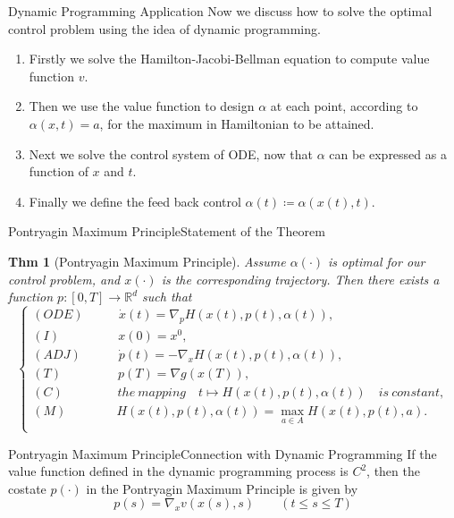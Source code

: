 \documentclass[english]{pkuslide}
\newtheorem{Thm}{Thm}
\begin{document}
\begin{frame}{Dynamic Programming} {Application}
Now we discuss how to solve the optimal control problem using the idea of dynamic programming.
\begin{enumerate}[<+->]
\item Firstly we solve the Hamilton-Jacobi-Bellman equation to compute value function $v$.
\item Then we use the value function to design $\alpha$ at each point, according to $\alpha(x,t)=a$, for the maximum in Hamiltonian to be attained.
\item Next we solve the control system of ODE, now that $\alpha$ can be expressed as a function of $x$ and $t$.
\item Finally we define the feed back control $\alpha(t) \coloneqq \alpha(x(t),t)$.
\end{enumerate}
\end{frame}
\begin{frame}{Pontryagin Maximum Principle}{Statement of the Theorem}
\begin{Thm}[Pontryagin Maximum Principle]
Assume $\alpha(\cdot)$ is optimal for our control problem, and $x(\cdot)$ is the corresponding trajectory. Then there exists a function \begin{math} p : [0,T] \to \mathbb{R}^{d} \end{math} such that
\begin{equation}
  \left\{
   \begin{array}{l}
  (ODE) \qquad \,\,\,\,\,\dot{x}(t) = \nabla_{p}{H}(x(t),p(t),\alpha(t)),  \\
   (I) \qquad \qquad \,\,\,\,x(0) = x^0,  \\
   (ADJ) \qquad\,\,\,\,\,\, \dot{p}(t) = -\nabla_{x}{H}(x(t),p(t),\alpha(t)),  \\
   (T) \qquad \qquad \,\,\,p(T) = \nabla g(x(T)),  \\
  (C) \qquad \qquad \,\,the\  mapping \quad t \mapsto H(x(t),p(t),\alpha(t)) \quad is \ constant, \\
   (M) \qquad \qquad H(x(t),p(t),\alpha(t))= \max_{a \in A}{H(x(t),p(t),a)} .  \\
   \end{array}
  \right.
\end{equation} 

\end{Thm}
\end{frame}
\begin{frame}{Pontryagin Maximum Principle}{Connection with Dynamic Programming}
If the value function defined in the dynamic programming process is $C^2$, then the costate $p(\cdot)$ in the Pontryagin Maximum Principle is given by
\begin{equation}
p(s) = \nabla_{x} v(x(s) ,s) \qquad  (t\leq s \leq T)
\end{equation}
\end{frame}
\end{document}
